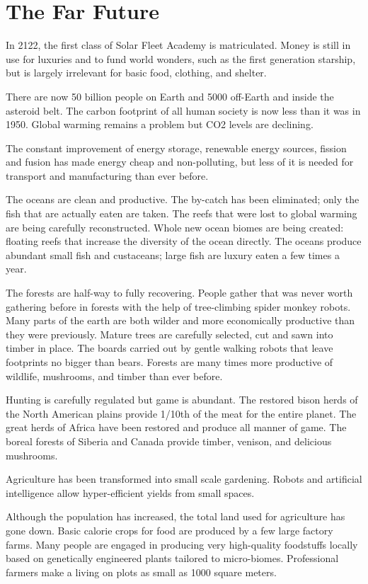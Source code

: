 \documentclass[
	fontsize=10pt, %
	twoside=false, %
	secnumdepth=1, %
]{kaobook}
\begin{document}
\section{The Far Future}

In 2122, the first class of Solar Fleet Academy is matriculated.
Money is still in use for luxuries and to fund world wonders,
such as the first generation starship, but is largely irrelevant
for basic food, clothing, and shelter.

There are now 50 billion people on Earth and 5000 off-Earth
and inside the asteroid belt. The carbon footprint of all human
society is now less than it was in 1950. Global warming
remains a problem but CO2 levels are declining.

The constant improvement of energy storage, renewable energy sources,
fission and fusion
has made energy cheap and non-polluting, but less of it is needed
for transport and manufacturing than ever before.

The oceans are clean and productive. The by-catch has been
eliminated; only the fish that are actually eaten are taken.
The reefs that were lost to global warming are being carefully
reconstructed.
Whole new ocean biomes are being created: floating reefs
that increase the diversity of the ocean directly.
The oceans produce abundant small fish and custaceans; large fish are luxury
eaten a few times a year.

The forests are half-way to fully recovering.
People gather that was never worth gathering before in forests
with the help of tree-climbing spider monkey robots.
Many parts
of the earth are both wilder and more economically productive than
they were previously.
Mature trees are carefully selected, cut and sawn into timber
in place.
The boards carried out by gentle walking robots that leave footprints
no bigger than bears.
Forests are many times more productive of wildlife, mushrooms, and timber
than ever before.


Hunting is carefully regulated but game is abundant.
The restored bison herds of the North American plains provide 1/10th of the meat
for the entire planet.
The great herds of Africa have been restored and produce all manner of game.
The boreal forests of Siberia and Canada provide timber,
venison, and delicious mushrooms.

Agriculture has been transformed into small scale gardening.
Robots and
artificial intelligence allow hyper-efficient yields from small
spaces.

Although the population has increased, the total land
used for agriculture has gone down.
Basic calorie crops for food are produced by a few large factory farms.
Many people are engaged in producing
very high-quality foodstuffs locally based on genetically engineered
plants tailored to micro-biomes.
Professional farmers make a living on plots as small as 1000 square meters.
\end{document}
